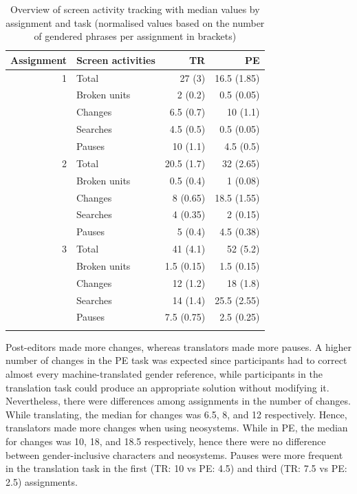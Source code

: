 \begin{table}[ht]
    \caption[Overview of screen activity tracking with median values by assignment and task]{Overview of screen activity tracking with median values by assignment and task (normalised values based on the number of gendered phrases per assignment in brackets)}
    \centering
    \begin{tabular}{rlrr} \lsptoprule
        \textbf{Assignment} & \textbf{Screen activities} & \textbf{TR} & \textbf{PE} \\
\midrule
        1 & Total & 27 (3) & 16.5 (1.85) \\
          & Broken units & 2 (0.2) & 0.5 (0.05) \\
          & Changes & 6.5 (0.7) & 10 (1.1) \\
          & Searches & 4.5 (0.5) & 0.5 (0.05) \\
          & Pauses & 10 (1.1) & 4.5 (0.5) \\ \midrule
        2 & Total & 20.5 (1.7) & 32 (2.65) \\
          & Broken units & 0.5 (0.4) & 1 (0.08) \\
          & Changes & 8 (0.65) & 18.5 (1.55) \\
          & Searches & 4 (0.35) & 2 (0.15) \\
          & Pauses & 5 (0.4) & 4.5 (0.38) \\ \midrule
        3 & Total & 41 (4.1) & 52 (5.2) \\
          & Broken units & 1.5 (0.15) & 1.5 (0.15) \\
          & Changes & 12 (1.2) & 18 (1.8) \\
          & Searches & 14 (1.4) & 25.5 (2.55) \\
          & Pauses & 7.5 (0.75) & 2.5 (0.25) \\
\lspbottomrule
    \end{tabular}
    \label{tab:technicaleffort}
\end{table}

Post-editors made more changes, whereas translators made more pauses. A higher number of changes in the PE task was expected since participants had to correct almost every machine-translated gender reference, while participants in the translation task could produce an appropriate solution without modifying it. Nevertheless, there were differences among assignments in the number of changes. While translating, the median for changes was 6.5, 8, and 12 respectively. Hence, translators made more changes when using neosystems. While in PE, the median for changes was 10, 18, and 18.5 respectively, hence there were no difference between gender-inclusive characters and neosystems. Pauses were more frequent in the translation task in the first (TR: 10 vs PE: 4.5) and third (TR: 7.5 vs PE: 2.5) assignments. 

